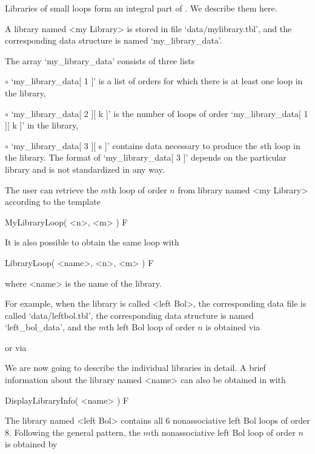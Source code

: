 
\label{lib}
Libraries of small loops form an integral part of {\LOOPS}. We describe them
here.


A library named <my Library> is stored in file `data/mylibrary.tbl', and the
corresponding data structure is named `my_library_data'.

The array `my_library_data' consists of three lists
\beginlist%
\item{$\circ$}
    `my_library_data[ 1 ]' is a list of orders for which there is at
    least one loop in the library,
\item{$\circ$}
    `my_library_data[ 2 ][ k ]' is the number of loops of order
    `my_library_data[ 1 ][ k ]' in the library,
\item{$\circ$}
    `my_library_data[ 3 ][ s ]' contains data necessary to produce the
    $s$th loop in the library.
\endlist
The format of `my_library_data[ 3 ]' depends on the particular library and is
not standardized in any way.

The user can retrieve the $m$th loop of order $n$ from library named <my
Library> according to the template

\>MyLibraryLoop( <n>, <m> ) F

It is also possible to obtain the same loop with

\>LibraryLoop( <name>, <n>, <m> ) F

where <name> is the name of the library.

For example, when the library is called <left Bol>, the corresponding data file
is called `data/leftbol.tbl', the corresponding data structure is named
`left_bol_data', and the $m$th left Bol loop of order $n$ is obtained via


or via


We are now going to describe the individual libraries in detail. A brief
information about the library named <name> can also be obtained in {\LOOPS}
with

\>DisplayLibraryInfo( <name> ) F


The library named <left Bol> contains all $6$ nonassociative left Bol loops of
order $8$. Following the general pattern, the $m$th nonassociative left Bol
loop of order $n$ is obtained by

